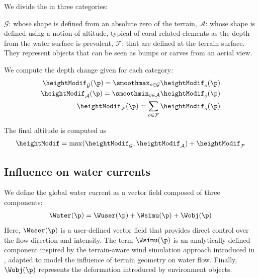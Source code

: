 We divide the  in three categories: 
\begin{Itemize}
    \Item{} $\mathcal{G}$:  whose shape is defined from an absolute zero of the terrain,
    \Item{} $\mathcal{A}$:  whose shape is defined using a notion of altitude, typical of coral-related elements as the depth from the water surface is prevalent,
    \Item{} $\mathcal{F}$:  that are defined at the terrain surface. They represent objects that can be seen as bumps or carves from an aerial view. 
\end{Itemize}


We compute the depth change given for each category:
\begin{align*}
    \heightModif_{\mathcal{G}} (\p) = \smoothmax_{o \in \mathcal{G}}{ \heightModif_o(\p) } \\
    \heightModif_{\mathcal{A}} (\p) = \smoothmin_{o \in \mathcal{A}}{ \heightModif_o(\p) } \\
    \heightModif_{\mathcal{F}} (\p) = \sum_{o \in \mathcal{F}}{ \heightModif_o(\p) }
\end{align*}

The final altitude is computed as
\begin{align}
    \heightModif = \max(\heightModif_{\mathcal{G}}, \heightModif_{\mathcal{A}}) + \heightModif_{\mathcal{F}}
\end{align}

\subsection{Influence on water currents}
\label{sec:env-obj_water-currents}

We define the global water current as a vector field composed of three components:
\begin{align}
    \Water(\p) = \Wuser(\p) + \Wsimu(\p) + \Wobj(\p)
\end{align}
Here, $\Wuser(\p)$ is a user-defined vector field that provides direct control over the flow direction and intensity. The term $\Wsimu(\p)$ is an analytically defined component inspired by the terrain-aware wind simulation approach introduced in \citep{Paris2019b}, adapted to model the influence of terrain geometry on water flow. Finally, $\Wobj(\p)$ represents the deformation introduced by environment objects.

